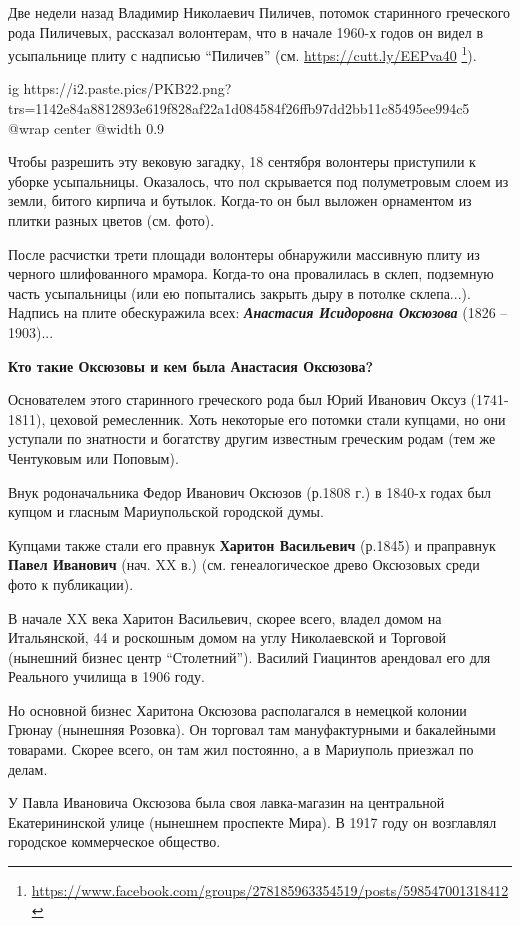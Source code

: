Две недели назад Владимир Николаевич Пиличев, потомок старинного греческого
рода Пиличевых, рассказал волонтерам, что в начале 1960-х годов он видел в
усыпальнице плиту с надписью \enquote{Пиличев} (см.
\url{https://cutt.ly/EEPva40}
\footnote{\url{https://www.facebook.com/groups/278185963354519/posts/598547001318412}}).

\ifcmt
  ig https://i2.paste.pics/PKB22.png?trs=1142e84a8812893e619f828af22a1d084584f26ffb97dd2bb11c85495ee994c5
  @wrap center
  @width 0.9
\fi

Чтобы разрешить эту вековую загадку, 18 сентября волонтеры приступили к уборке
усыпальницы. Оказалось, что пол скрывается под полуметровым слоем из земли,
битого кирпича и бутылок. Когда-то он был выложен орнаментом из плитки разных
цветов (см. фото).

После расчистки трети площади волонтеры обнаружили массивную плиту из черного
шлифованного мрамора. Когда-то она провалилась в склеп, подземную часть
усыпальницы (или ею попытались закрыть дыру в потолке склепа...). Надпись на
плите обескуражила всех: \textbf{\em Анастасия Исидоровна Оксюзова} (1826 – 1903)...

\textbf{Кто такие Оксюзовы и кем была Анастасия Оксюзова?}

Основателем этого старинного греческого рода был Юрий Иванович Оксуз
(1741-1811), цеховой ремесленник. Хоть некоторые его потомки стали купцами, но
они уступали по знатности и богатству другим известным греческим родам (тем же
Чентуковым или Поповым).

Внук родоначальника Федор Иванович Оксюзов (р.1808 г.) в 1840-х годах был
купцом и гласным Мариупольской городской думы.

Купцами также стали его правнук \textbf{Харитон Васильевич} (р.1845) и
праправнук \textbf{Павел Иванович} (нач. XX в.) (см. генеалогическое древо
Оксюзовых среди фото к публикации).

В начале XX века Харитон Васильевич, скорее всего, владел домом на Итальянской,
44 и роскошным домом на углу Николаевской и Торговой (нынешний бизнес центр
\enquote{Столетний}). Василий Гиацинтов арендовал его для Реального училища в 1906
году.

Но основной бизнес Харитона Оксюзова располагался в немецкой колонии Грюнау
(нынешняя Розовка). Он торговал там мануфактурными и бакалейными товарами.
Скорее всего, он там жил постоянно, а в Мариуполь приезжал по делам.

У Павла Ивановича Оксюзова была своя лавка-магазин на центральной
Екатерининской улице (нынешнем проспекте Мира). В 1917 году он возглавлял
городское коммерческое общество.

